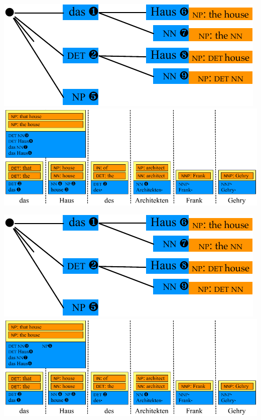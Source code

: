 \documentclass[landscape]{slides}
\begin{document}

\begin{center}\vspace{7mm}
\includegraphics[scale=1.4]{accessing-grammar-rules-prefix-early9.pdf}\\[-1mm]
\includegraphics[scale=1.4]{accessing-grammar-rules-early-example11.pdf}
\end{center}


\begin{center}\vspace{7mm}
\includegraphics[scale=1.4]{accessing-grammar-rules-prefix-early9.pdf}\\[-1mm]
\includegraphics[scale=1.4]{accessing-grammar-rules-early-example12.pdf}
\end{center}
\end{document}
